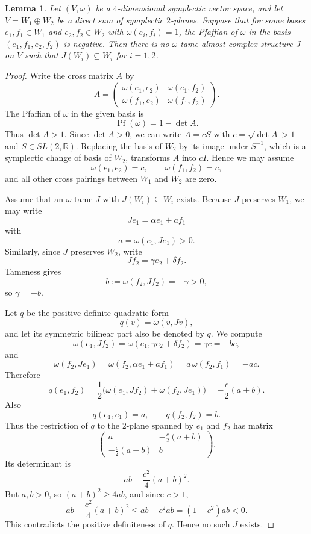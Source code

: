 \documentclass{article}
\newtheorem{lemma}{Lemma}
\begin{document}
\begin{lemma}
Let $(V,\omega)$ be a $4$-dimensional symplectic vector space, and let
$V=W_1\oplus W_2$ be a direct sum of symplectic $2$-planes.
Suppose that for some bases $e_1,f_1\in W_1$ and $e_2,f_2\in W_2$ with
$\omega(e_i,f_i)=1$, the Pfaffian of $\omega$ in the basis
$(e_1,f_1,e_2,f_2)$ is negative.
Then there is no $\omega$-tame almost complex structure $J$ on $V$
such that $J(W_i)\subseteq W_i$ for $i=1,2$.
\end{lemma}

\begin{proof}
Write the cross matrix $A$ by
\[
A=\begin{pmatrix}
\omega(e_1,e_2)&\omega(e_1,f_2)\\
\omega(f_1,e_2)&\omega(f_1,f_2)
\end{pmatrix}.
\]
The Pfaffian of $\omega$ in the given basis is
\[
\operatorname{Pf}(\omega)=1-\det A.
\]
Thus $\det A>1$. Since $\det A>0$, we can write
$A=cS$ with $c=\sqrt{\det A}>1$ and $S\in SL(2,\mathbb{R})$.
Replacing the basis of $W_2$ by its image under $S^{-1}$, which is a symplectic change of basis of $W_2$, transforms $A$ into $cI$.
Hence we may assume
\[
\omega(e_1,e_2)=c,\qquad \omega(f_1,f_2)=c,
\]
and all other cross pairings between $W_1$ and $W_2$ are zero.

Assume that an $\omega$-tame $J$ with $J(W_i)\subseteq W_i$ exists.
Because $J$ preserves $W_1$, we may write
\[
Je_1=\alpha e_1+a f_1
\]
with
\[
a=\omega(e_1,Je_1)>0.
\]
Similarly, since $J$ preserves $W_2$, write
\[
Jf_2=\gamma e_2+\delta f_2.
\]
Tameness gives
\[
b:=\omega(f_2,Jf_2)=-\gamma>0,
\]
so $\gamma=-b$.

Let $q$ be the positive definite quadratic form
\[
q(v)=\omega(v,Jv),
\]
and let its symmetric bilinear part also be denoted by $q$.
We compute
\[
\omega(e_1,Jf_2)
=
\omega(e_1,\gamma e_2+\delta f_2)
=
\gamma c
=
-bc,
\]
and
\[
\omega(f_2,Je_1)
=
\omega(f_2,\alpha e_1+a f_1)
=
a\,\omega(f_2,f_1)
=
-ac.
\]
Therefore
\[
q(e_1,f_2)
=
\frac12\bigl(\omega(e_1,Jf_2)+\omega(f_2,Je_1)\bigr)
=
-\frac c2(a+b).
\]
Also
\[
q(e_1,e_1)=a,\qquad q(f_2,f_2)=b.
\]
Thus the restriction of $q$ to the $2$-plane spanned by $e_1$ and $f_2$ has matrix
\[
\begin{pmatrix}
a&-\frac c2(a+b)\\[2mm]
-\frac c2(a+b)&b
\end{pmatrix}.
\]
Its determinant is
\[
ab-\frac{c^2}{4}(a+b)^2.
\]
But $a,b>0$, so $(a+b)^2\ge 4ab$, and since $c>1$,
\[
ab-\frac{c^2}{4}(a+b)^2
\le
ab-c^2ab
=
(1-c^2)ab
<0.
\]
This contradicts the positive definiteness of $q$. Hence no such $J$ exists.
\end{proof}
\end{document}
